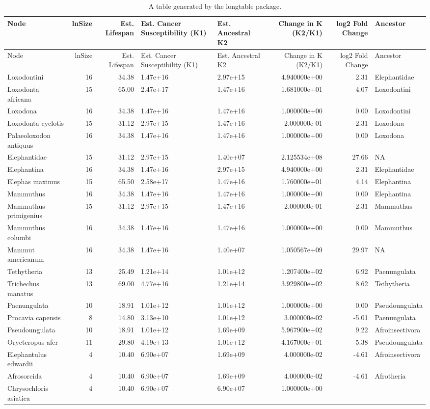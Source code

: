 \documentclass[10pt,letterpaper]{article}
\begin{document}
\begin{longtable}[]{@{}lrrllrrl@{}}
\caption{A table generated by the longtable package.}\tabularnewline
\toprule
Node & lnSize & Est. Lifespan & Est. Cancer Susceptibility (K1) & Est.
Ancestral K2 & Change in K (K2/K1) & log2 Fold Change &
Ancestor\tabularnewline
\midrule
\endfirsthead
\toprule
Node & lnSize & Est. Lifespan & Est. Cancer Susceptibility (K1) & Est.
Ancestral K2 & Change in K (K2/K1) & log2 Fold Change &
Ancestor\tabularnewline
\midrule
\endhead
Loxodontini & 16 & 34.38 & 1.47e+16 & 2.97e+15 & 4.940000e+00 & 2.31 &
Elephantidae\tabularnewline
Loxodonta africana & 15 & 65.00 & 2.47e+17 & 1.47e+16 & 1.681000e+01 &
4.07 & Loxodontini\tabularnewline
Loxodona & 16 & 34.38 & 1.47e+16 & 1.47e+16 & 1.000000e+00 & 0.00 &
Loxodontini\tabularnewline
Loxodonta cyclotis & 15 & 31.12 & 2.97e+15 & 1.47e+16 & 2.000000e-01 &
-2.31 & Loxodona\tabularnewline
Palaeoloxodon antiquus & 16 & 34.38 & 1.47e+16 & 1.47e+16 & 1.000000e+00
& 0.00 & Loxodona\tabularnewline
Elephantidae & 15 & 31.12 & 2.97e+15 & 1.40e+07 & 2.125534e+08 & 27.66 &
NA\tabularnewline
Elephantina & 16 & 34.38 & 1.47e+16 & 2.97e+15 & 4.940000e+00 & 2.31 &
Elephantidae\tabularnewline
Elephas maximus & 15 & 65.50 & 2.58e+17 & 1.47e+16 & 1.760000e+01 & 4.14
& Elephantina\tabularnewline
Mammuthus & 16 & 34.38 & 1.47e+16 & 1.47e+16 & 1.000000e+00 & 0.00 &
Elephantina\tabularnewline
Mammuthus primigenius & 15 & 31.12 & 2.97e+15 & 1.47e+16 & 2.000000e-01
& -2.31 & Mammuthus\tabularnewline
Mammuthus columbi & 16 & 34.38 & 1.47e+16 & 1.47e+16 & 1.000000e+00 &
0.00 & Mammuthus\tabularnewline
Mammut americanum & 16 & 34.38 & 1.47e+16 & 1.40e+07 & 1.050567e+09 &
29.97 & NA\tabularnewline
Tethytheria & 13 & 25.49 & 1.21e+14 & 1.01e+12 & 1.207400e+02 & 6.92 &
Paenungulata\tabularnewline
Trichechus manatus & 13 & 69.00 & 4.77e+16 & 1.21e+14 & 3.929800e+02 &
8.62 & Tethytheria\tabularnewline
Paenungulata & 10 & 18.91 & 1.01e+12 & 1.01e+12 & 1.000000e+00 & 0.00 &
Pseudoungulata\tabularnewline
Procavia capensis & 8 & 14.80 & 3.13e+10 & 1.01e+12 & 3.000000e-02 &
-5.01 & Paenungulata\tabularnewline
Pseudoungulata & 10 & 18.91 & 1.01e+12 & 1.69e+09 & 5.967900e+02 & 9.22
& Afroinsectivora\tabularnewline
Orycteropus afer & 11 & 29.80 & 4.19e+13 & 1.01e+12 & 4.167000e+01 &
5.38 & Pseudoungulata\tabularnewline
Elephantulus edwardii & 4 & 10.40 & 6.90e+07 & 1.69e+09 & 4.000000e-02 &
-4.61 & Afroinsectivora\tabularnewline
Afrosorcida & 4 & 10.40 & 6.90e+07 & 1.69e+09 & 4.000000e-02 & -4.61 &
Afrotheria\tabularnewline
Chrysochloris asiatica & 4 & 10.40 & 6.90e+07 & 6.90e+07 & 1.000000e+00

\end{longtable}
\end{document}
